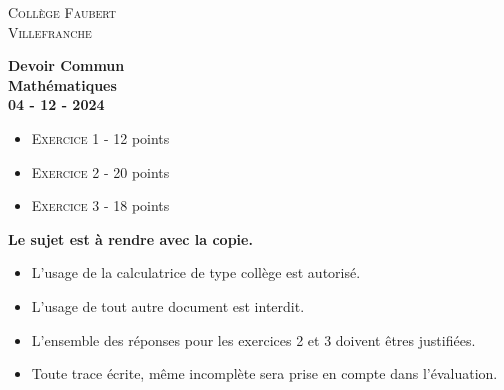 






\begin{titlepage}

    \center %
    
    \textsc{\LARGE Collège Faubert}\\[2cm] %
    \textsc{\large Villefranche}\\[2cm] %
    
    \horrule{2px}
    
    \vspace{1cm}
    
    { \Huge \bfseries Devoir Commun}\\[2cm] %
    { \Huge \bfseries Mathématiques}\\[2cm] %
    {\large \bfseries 04 - 12 - 2024}\\[2cm] 
    
    \horrule{2px}
    
    \vspace{1cm}
    
    \begin{itemize}[label={$\bullet$}]
      \item \textsc{Exercice 1} - 12 points     
      \item \textsc{Exercice 2} - 20 points 
      \item \textsc{Exercice 3} - 18 points 
    \end{itemize}
    
    \vspace{1cm}
    
    \horrule{2px}
    
    \vspace{1cm}
    
    \textbf{Le sujet est à rendre avec la copie.}
    
    \vspace{1cm}
    
    \begin{itemize}
      \item L'usage de la calculatrice de type collège est autorisé.
      \item L'usage de tout autre document est interdit. 
      \item L'ensemble des réponses pour les exercices 2 et 3 doivent êtres justifiées.
      \item Toute trace écrite, même incomplète sera prise en compte dans l'évaluation.
    \end{itemize}
    
    \vfill 
    
    \end{titlepage}
    

